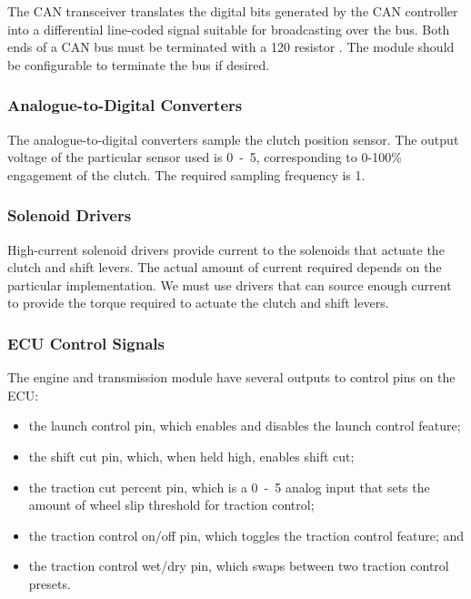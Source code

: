 The CAN transceiver translates the digital bits generated by the CAN controller into a differential line-coded signal suitable for broadcasting over the bus. Both ends of a CAN bus must be terminated with a \unit{120}{\ohm} resistor \cite{MCP2551}. The module should be configurable to terminate the bus if desired.

\subsubsection{Analogue-to-Digital Converters}

The analogue-to-digital converters sample the clutch position sensor. The output voltage of the particular sensor used is \unit{0-5}{\volt}, corresponding to 0-100\% engagement of the clutch. The required sampling frequency is \unit{1}{\kilo\hertz}.

\subsubsection{Solenoid Drivers}

High-current solenoid drivers provide current to the solenoids that actuate the clutch and shift levers. The actual amount of current required depends on the particular implementation. We must use drivers that can source enough current to provide the torque required to actuate the clutch and shift levers. 
 
\subsubsection{ECU Control Signals}

The engine and transmission module have several outputs to control pins on the ECU:

\begin{itemize}
  \item the launch control pin, which enables and disables the launch control feature;
  \item the shift cut pin, which, when held high, enables shift cut;
  \item the traction cut percent pin, which is a \unit{0-5}{\volt} analog input that sets the amount of wheel slip threshold for traction control;
  \item the traction control on/off pin, which toggles the traction control feature; and
  \item the traction control wet/dry pin, which swaps between two traction control presets.
\end{itemize}

